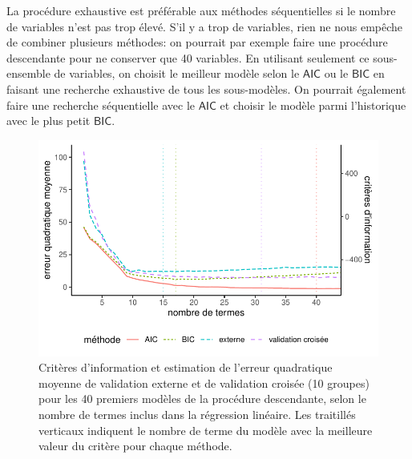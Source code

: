 \documentclass[
  11pt,
  letterpaper,
]{scrbook}
\theoremstyle{definition}
\theoremstyle{remark}
\begin{document}
La procédure exhaustive est préférable aux méthodes séquentielles si le
nombre de variables n'est pas trop élevé. S'il y a trop de variables,
rien ne nous empêche de combiner plusieurs méthodes: on pourrait par
exemple faire une procédure descendante pour ne conserver que 40
variables. En utilisant seulement ce sous-ensemble de variables, on
choisit le meilleur modèle selon le \(\mathsf{AIC}\) ou le
\(\mathsf{BIC}\) en faisant une recherche exhaustive de tous les
sous-modèles. On pourrait également faire une recherche séquentielle
avec le \(\mathsf{AIC}\) et choisir le modèle parmi l'historique avec le
plus petit \(\mathsf{BIC}\).

\begin{figure}[ht!]

{\centering \includegraphics[width=1\textwidth,height=\textheight]{./04-selectionmodeles_files/figure-pdf/fig-perfo-sequentiel-1.pdf}

}

\caption{\label{fig-perfo-sequentiel}Critères d'information et
estimation de l'erreur quadratique moyenne de validation externe et de
validation croisée (10 groupes) pour les 40 premiers modèles de la
procédure descendante, selon le nombre de termes inclus dans la
régression linéaire. Les traitillés verticaux indiquent le nombre de
terme du modèle avec la meilleure valeur du critère pour chaque
méthode.}

\end{figure}
\end{document}
